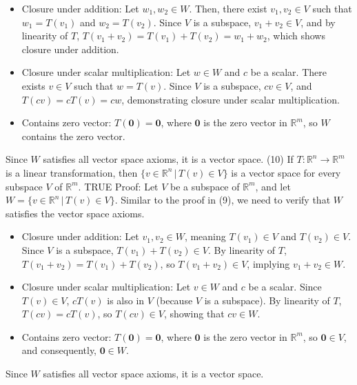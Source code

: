 \documentclass{article}
\begin{document}
\begin{itemize}
    \item Closure under addition: Let \(w_1, w_2 \in W\). Then, there exist \(v_1, v_2 \in V\) such that \(w_1 = T(v_1)\) and \(w_2 = T(v_2)\). Since \(V\) is a subspace, \(v_1 + v_2 \in V\), and by linearity of \(T\), \(T(v_1 + v_2) = T(v_1) + T(v_2) = w_1 + w_2\), which shows closure under addition.
    \item Closure under scalar multiplication: Let \(w \in W\) and \(c\) be a scalar. There exists \(v \in V\) such that \(w = T(v)\). Since \(V\) is a subspace, \(cv \in V\), and \(T(cv) = cT(v) = cw\), demonstrating closure under scalar multiplication.
    \item Contains zero vector: \(T(\mathbf{0}) = \mathbf{0}\), where \(\mathbf{0}\) is the zero vector in \(\mathbb{R}^m\), so \(W\) contains the zero vector.
\end{itemize}
Since \(W\) satisfies all vector space axioms, it is a vector space. 
\newline
\newline
(10) If \(T : \mathbb{R}^n \rightarrow \mathbb{R}^m\) is a linear transformation, then \(\{v \in \mathbb{R}^n \,|\, T(v) \in V\}\) is a vector space for every subspace \(V\) of \(\mathbb{R}^m\). TRUE
\newline
Proof: Let \(V\) be a subspace of \(\mathbb{R}^m\), and let \(W = \{v \in \mathbb{R}^n \,|\, T(v) \in V\}\). Similar to the proof in (9), we need to verify that \(W\) satisfies the vector space axioms.
\begin{itemize}
    \item Closure under addition: Let \(v_1, v_2 \in W\), meaning \(T(v_1) \in V\) and \(T(v_2) \in V\). Since \(V\) is a subspace, \(T(v_1) + T(v_2) \in V\). By linearity of \(T\), \(T(v_1 + v_2) = T(v_1) + T(v_2)\), so \(T(v_1 + v_2) \in V\), implying \(v_1 + v_2 \in W\).
    \item Closure under scalar multiplication: Let \(v \in W\) and \(c\) be a scalar. Since \(T(v) \in V\), \(cT(v)\) is also in \(V\) (because \(V\) is a subspace). By linearity of \(T\), \(T(cv) = cT(v)\), so \(T(cv) \in V\), showing that \(cv \in W\).
    \item Contains zero vector: \(T(\mathbf{0}) = \mathbf{0}\), where \(\mathbf{0}\) is the zero vector in \(\mathbb{R}^m\), so \(\mathbf{0} \in V\), and consequently, \(\mathbf{0} \in W\).
\end{itemize}
Since \(W\) satisfies all vector space axioms, it is a vector space.
\end{document}
